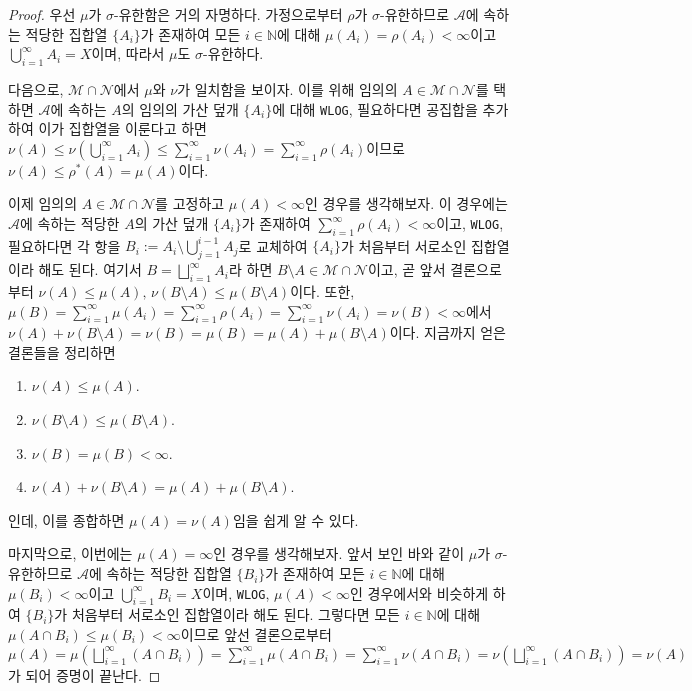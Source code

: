 \begin{proof}
    우선 $\mu$가 $\sigma$-유한함은 거의 자명하다. 가정으로부터 $\rho$가 $\sigma$-유한하므로 $\mathcal{A}$에 속하는 적당한 집합열 $\{A_i\}$가 존재하여 모든 $i\in\mathbb{N}$에 대해 $\mu(A_i)=\rho(A_i)<\infty$이고 $\bigcup_{i=1}^\infty A_i=X$이며, 따라서 $\mu$도 $\sigma$-유한하다.

    다음으로, $\mathcal{M}\cap\mathcal{N}$에서 $\mu$와 $\nu$가 일치함을 보이자. 이를 위해 임의의 $A\in\mathcal{M}\cap\mathcal{N}$를 택하면 $\mathcal{A}$에 속하는 $A$의 임의의 가산 덮개 $\{A_i\}$에 대해 \texttt{WLOG}, 필요하다면 공집합을 추가하여 이가 집합열을 이룬다고 하면 $\nu(A)\leq\nu(\bigcup_{i=1}^\infty A_i)\leq\sum_{i=1}^\infty\nu(A_i)=\sum_{i=1}^\infty\rho(A_i)$이므로 $\nu(A)\leq\rho^*(A)=\mu(A)$이다.

    이제 임의의 $A\in\mathcal{M}\cap\mathcal{N}$를 고정하고 $\mu(A)<\infty$인 경우를 생각해보자. 이 경우에는 $\mathcal{A}$에 속하는 적당한 $A$의 가산 덮개 $\{A_i\}$가 존재하여 $\sum_{i=1}^\infty\rho(A_i)<\infty$이고, \texttt{WLOG},  필요하다면 각 항을 $B_i:=A_i\setminus\bigcup_{j=1}^{i-1}A_j$로 교체하여 $\{A_i\}$가 처음부터 서로소인 집합열이라 해도 된다.  여기서 $B=\bigsqcup_{i=1}^\infty A_i$라 하면 $B\setminus A\in\mathcal{M}\cap\mathcal{N}$이고, 곧 앞서 결론으로부터 $\nu(A)\leq\mu(A),\,\nu(B\setminus A)\leq\mu(B\setminus A)$이다. 또한, $\mu(B)=\sum_{i=1}^\infty\mu(A_i)=\sum_{i=1}^\infty\rho(A_i)=\sum_{i=1}^\infty\nu(A_i)=\nu(B)<\infty$에서 $\nu(A)+\nu(B\setminus A)=\nu(B)=\mu(B)=\mu(A)+\mu(B\setminus A)$이다. 지금까지 얻은 결론들을 정리하면
    \begin{enumerate}
        \item $\nu(A)\leq\mu(A)$.
        \item $\nu(B\setminus A)\leq\mu(B\setminus A)$.
        \item $\nu(B)=\mu(B)<\infty$.
        \item $\nu(A)+\nu(B\setminus A)=\mu(A)+\mu(B\setminus A)$.
    \end{enumerate}
    인데, 이를 종합하면 $\mu(A)=\nu(A)$임을 쉽게 알 수 있다.

    마지막으로, 이번에는 $\mu(A)=\infty$인 경우를 생각해보자. 앞서 보인 바와 같이 $\mu$가 $\sigma$-유한하므로 $\mathcal{A}$에 속하는 적당한 집합열 $\{B_i\}$가 존재하여 모든 $i\in\mathbb{N}$에 대해 $\mu(B_i)<\infty$이고 $\bigcup_{i=1}^\infty B_i=X$이며, \texttt{WLOG}, $\mu(A)<\infty$인 경우에서와 비슷하게 하여 $\{B_i\}$가 처음부터 서로소인 집합열이라 해도 된다. 그렇다면 모든 $i\in\mathbb{N}$에 대해 $\mu(A\cap B_i)\leq\mu(B_i)<\infty$이므로 앞선 결론으로부터 $\mu(A)=\mu(\bigsqcup_{i=1}^\infty(A\cap B_i))=\sum_{i=1}^\infty\mu(A\cap B_i)=\sum_{i=1}^\infty\nu(A\cap B_i)=\nu(\bigsqcup_{i=1}^\infty(A\cap B_i))=\nu(A)$가 되어 증명이 끝난다.
\end{proof}

